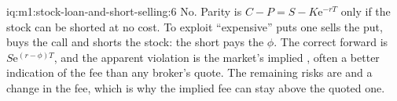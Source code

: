 \begin{solution}{iq:m1:stock-loan-and-short-selling:6}
No. Parity is $C - P = S - K\mathrm{e}^{-rT}$ only if the stock can be shorted
at no cost. To exploit ``expensive'' puts one sells the put, buys the call
and shorts the stock: the short pays the  $\phi$. The correct
forward is $S\mathrm{e}^{(r-\phi)T}$, and the apparent violation is the
market's implied , often a better indication of the fee than any
broker's quote. The remaining risks are  and a change in the fee, which
is why the implied fee can stay above the quoted one.
\end{solution}
